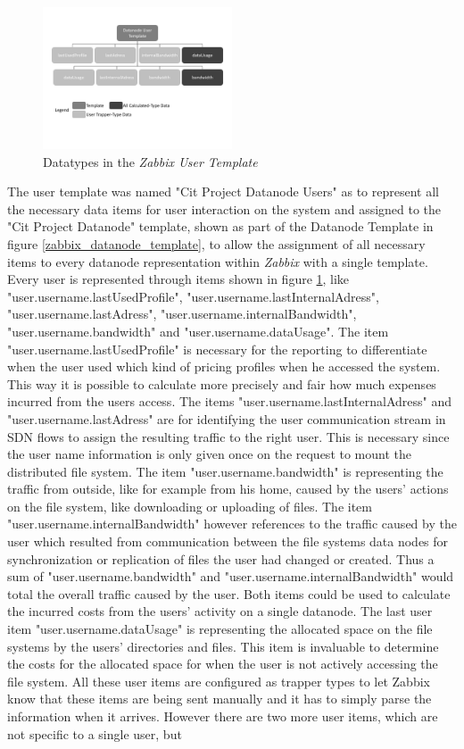 \begin{figure}[ht]
\centering
\includegraphics[width=0.5\textwidth]{img/ZabbixUserTemp} 

\caption{Datatypes in the \textit{Zabbix User Template}}
\label{zabbix_user_template}
\end{figure}	
	The user template was named "Cit Project Datanode Users" as to represent all the necessary data items for user interaction on the system and assigned to the "Cit Project Datanode" template, shown as part of the Datanode Template in figure \ref{zabbix_datanode_template}, to allow the assignment of all necessary items to every datanode representation within \textit{Zabbix} with a single template. Every user is represented through items shown in figure \ref{zabbix_user_template}, like "user.username.lastUsedProfile", "user.username.lastInternalAdress", "user.username.lastAdress", "user.username.internalBandwidth", "user.username.bandwidth" and "user.username.dataUsage". The item "user.username.lastUsedProfile" is necessary for the reporting to differentiate when the user used which kind of pricing profiles when he accessed the system. This way it is possible to calculate more precisely and fair how much expenses incurred from the users access. The items "user.username.lastInternalAdress" and "user.username.lastAdress" are for identifying the user communication stream in SDN flows to assign the resulting traffic to the right user. This is necessary since the user name information is only given once on the request to mount the distributed file system. The item "user.username.bandwidth" is representing the traffic from outside, like for example from his home, caused by the users' actions on the file system, like downloading or uploading of files. The item "user.username.internalBandwidth" however references to the traffic caused by the user which resulted from communication between the file systems data nodes for synchronization or replication of files the user had changed or created. Thus a sum of "user.username.bandwidth" and "user.username.internalBandwidth" would total the overall traffic caused by the user. Both items could be used to calculate the incurred costs from the users' activity on a single datanode. The last user item "user.username.dataUsage" is representing the allocated space on the file systems by the users' directories and files. This item is invaluable to determine the costs for the allocated space for when the user is not actively accessing the file system. All these user items are configured as trapper types to let Zabbix know that these items are being sent manually and it has to simply parse the information when it arrives. However there are two more user items, which are not specific to a single user, but 